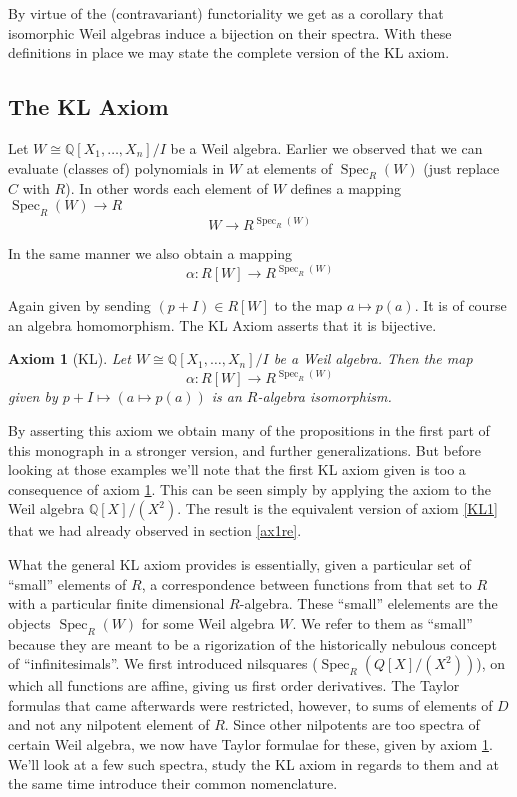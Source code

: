 \documentclass[11pt]{article}
\newtheorem{axiom}{Axiom}[section]
\theoremstyle{definition}
\DeclareMathOperator{\spec}{Spec}
\numberwithin{equation}{section}
\begin{document}
By virtue of the (contravariant) functoriality we get as a corollary that isomorphic Weil algebras induce a bijection on their spectra. With these definitions in place we may state the complete version of the KL axiom.

\subsection{The KL Axiom}

Let \( W\cong \mathbb{Q}[X_1,\dots,X_n]/I \) be a Weil algebra. Earlier we observed that we can evaluate (classes of) polynomials in \( W \) at elements of \( \spec_R(W) \) (just replace \( C \) with \( R \)). In other words each element of \( W \) defines a mapping \( \spec_R(W)\to R \)
\begin{equation*}
  W\to R^{\spec_R(W)}
\end{equation*}

In the same manner we also obtain a mapping
\begin{equation*}
  \alpha : R[W]\to R^{\spec_R(W)}
\end{equation*}

Again given by sending \( (p+I)\in R[W] \) to the map \( a\mapsto p(a) \). It is of course an algebra homomorphism. The KL Axiom asserts that it is bijective.
\begin{axiom}[KL]
  Let \( W\cong \mathbb{Q}[X_1,\dots,X_n]/I \) be a Weil algebra. Then the map
  \begin{equation*}
    \alpha : R[W]\to R^{\spec_R(W)}
  \end{equation*}
  given by \( p+I \mapsto (a\mapsto p(a)) \) is an \( R \)-algebra isomorphism.
  \label{ax:genKL}
\end{axiom}

By asserting this axiom we obtain many of the propositions in the first part of this monograph in a stronger version, and further generalizations. But before looking at those examples we'll note that the first KL axiom given is too a consequence of axiom \ref{ax:genKL}. This can be seen simply by applying the axiom to the Weil algebra \( \mathbb{Q}[X]/(X^2) \). The result is the equivalent version of axiom \ref{KL1} that we had already observed in section \ref{ax1re}.

What the general KL axiom provides is essentially, given a particular set of ``small'' elements of \( R \), a correspondence between functions from that set to \( R \) with a particular finite dimensional \( R \)-algebra. These ``small'' elelements are the objects \( \spec_R(W) \) for some Weil algebra \( W \).  We refer to them as ``small'' because they are meant to be a rigorization of the historically nebulous concept of ``infinitesimals''. We first introduced nilsquares (\( \spec_R(Q[X]/(X^2)) \)), on which all functions are affine, giving us first order derivatives. The Taylor formulas that came afterwards were restricted, however, to sums of elements of \( D \) and not any nilpotent element of \( R \). Since other nilpotents are too spectra of certain Weil algebra, we now have Taylor formulae for these, given by axiom \ref{ax:genKL}. We'll look at a few such spectra, study the KL axiom in regards to them and at the same time introduce their common nomenclature.
\end{document}
